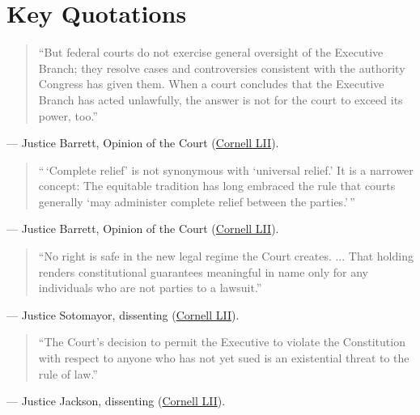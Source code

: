 \documentclass[12pt]{article}
\begin{document}
\section{Key Quotations}
\begin{quote}
``But federal courts do not exercise general oversight of the Executive Branch; they resolve cases and controversies consistent with the authority Congress has given them. When a court concludes that the Executive Branch has acted unlawfully, the answer is not for the court to exceed its power, too.''
\end{quote}
\noindent --- Justice Barrett, Opinion of the Court (\href{https://www.law.cornell.edu/supremecourt/text/24A884}{Cornell LII}).

\begin{quote}
``\,`Complete relief' is not synonymous with `universal relief.' It is a narrower concept: The equitable tradition has long embraced the rule that courts generally `may administer complete relief between the parties.'\,''
\end{quote}
\noindent --- Justice Barrett, Opinion of the Court (\href{https://www.law.cornell.edu/supremecourt/text/24A884}{Cornell LII}).

\begin{quote}
``No right is safe in the new legal regime the Court creates. ... That holding renders constitutional guarantees meaningful in name only for any individuals who are not parties to a lawsuit.''
\end{quote}
\noindent --- Justice Sotomayor, dissenting (\href{https://www.law.cornell.edu/supremecourt/text/24A884}{Cornell LII}).

\begin{quote}
``The Court's decision to permit the Executive to violate the Constitution with respect to anyone who has not yet sued is an existential threat to the rule of law.''
\end{quote}
\noindent --- Justice Jackson, dissenting (\href{https://www.law.cornell.edu/supremecourt/text/24A884}{Cornell LII}).
\end{document}
